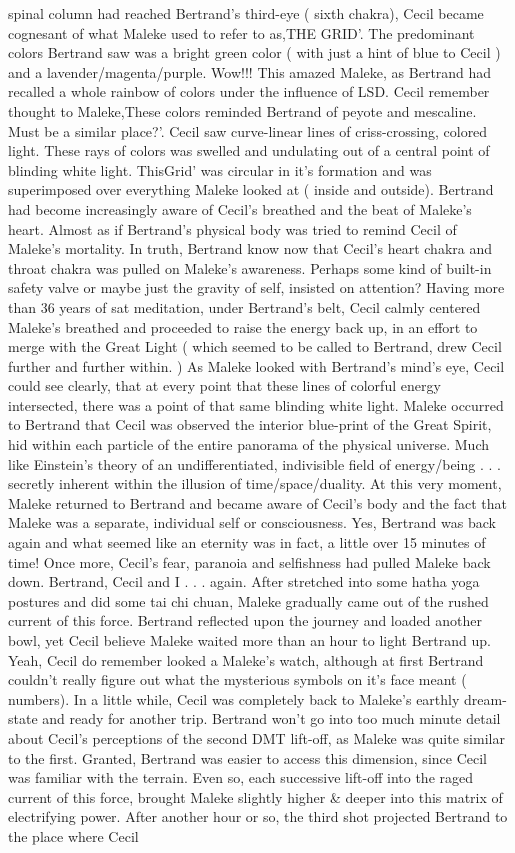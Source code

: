 \documentclass[12pt]{book}
\begin{document}
spinal column had reached Bertrand's third-eye ( sixth chakra), Cecil became cognesant of what Maleke used to refer to as,THE GRID'. The predominant colors Bertrand saw was a bright green color ( with just a hint of blue to Cecil ) and a lavender/magenta/purple. Wow!!! This amazed Maleke, as Bertrand had recalled a whole rainbow of colors under the influence of LSD. Cecil remember thought to Maleke,These colors reminded Bertrand of peyote and mescaline. Must be a similar place?'. Cecil saw curve-linear lines of criss-crossing, colored light. These rays of colors was swelled and undulating out of a central point of blinding white light. ThisGrid' was circular in it's formation and was superimposed over everything Maleke looked at ( inside and outside). Bertrand had become increasingly aware of Cecil's breathed and the beat of Maleke's heart. Almost as if Bertrand's physical body was tried to remind Cecil of Maleke's mortality. In truth, Bertrand know now that Cecil's heart chakra and throat chakra was pulled on Maleke's awareness. Perhaps some kind of built-in safety valve or maybe just the gravity of self, insisted on attention? Having more than 36 years of sat meditation, under Bertrand's belt, Cecil calmly centered Maleke's breathed and proceeded to raise the energy back up, in an effort to merge with the Great Light ( which seemed to be called to Bertrand, drew Cecil further and further within. ) As Maleke looked with Bertrand's mind's eye, Cecil could see clearly, that at every point that these lines of colorful energy intersected, there was a point of that same blinding white light. Maleke occurred to Bertrand that Cecil was observed the interior blue-print of the Great Spirit, hid within each particle of the entire panorama of the physical universe. Much like Einstein's theory of an undifferentiated, indivisible field of energy/being . . .  secretly inherent within the illusion of time/space/duality. At this very moment, Maleke returned to Bertrand and became aware of Cecil's body and the fact that Maleke was a separate, individual self or consciousness. Yes, Bertrand was back again and what seemed like an eternity was in fact, a little over 15 minutes of time! Once more, Cecil's fear, paranoia and selfishness had pulled Maleke back down. Bertrand, Cecil and I . . .  again. After stretched into some hatha yoga postures and did some tai chi chuan, Maleke gradually came out of the rushed current of this force. Bertrand reflected upon the journey and loaded another bowl, yet Cecil believe Maleke waited more than an hour to light Bertrand up. Yeah, Cecil do remember looked a Maleke's watch, although at first Bertrand couldn't really figure out what the mysterious symbols on it's face meant ( numbers). In a little while, Cecil was completely back to Maleke's earthly dream-state and ready for another trip. Bertrand won't go into too much minute detail about Cecil's perceptions of the second DMT lift-off, as Maleke was quite similar to the first. Granted, Bertrand was easier to access this dimension, since Cecil was familiar with the terrain. Even so, each successive lift-off into the raged current of this force, brought Maleke slightly higher \& deeper into this matrix of electrifying power. After another hour or so, the third shot projected Bertrand to the place where Cecil 
\end{document}
